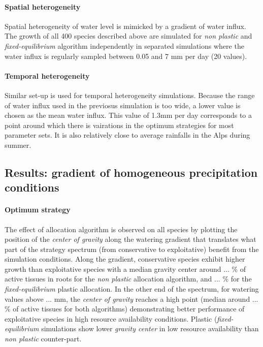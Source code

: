 \paragraph{Spatial heterogeneity}
Spatial heterogeneity of water level is mimicked by a gradient of water influx. The growth of all 400 species described above are simulated for \textit{non plastic} and \textit{fixed-equilibrium} algorithm independently in separated simulations where the water influx is regularly sampled between 0.05 and 7 mm per day (20 values).

\paragraph{Temporal heterogeneity}
Similar set-up is used for temporal heterogeneity simulations. Because the range of water influx used in the previosus simulation is too wide, a lower value is chosen as the mean water influx. This value of 1.3mm per day corresponds to a point around which there is vairations in the optimum strategies for most parameter sets. It is also relatively close to average rainfalls in the Alps during summer. 

\subsection{Results: gradient of homogeneous precipitation conditions}

\paragraph{Optimum strategy}

The effect of allocation algorithm is observed on all species by plotting the position of the \textit{center of gravity} along the watering gradient that translates what part of the strategy spectrum (from conservative to exploitative) benefit from the simulation conditions. Along the gradient, conservative species exhibit higher growth than exploitative species with a median gravity center around ... \% of active tissues in roots for the \textit{non plastic} allocation algorithm, and ... \% for the \textit{fixed-equilibrium} plastic allocation. In the other end of the spectrum, for watering values above ... mm, the \textit{center of gravity} reaches a high point (median around ... \% of active tissues for both algorithms) demonstrating better performance of exploitative species in high resource availability conditions. Plastic (\textit{fixed-equilibrium} simulations show lower \textit{gravity center} in low resource availability than \textit{non plastic} counter-part. 


